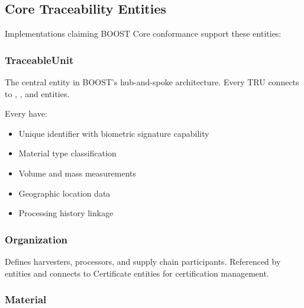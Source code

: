 
\subsection{Core Traceability Entities}
\label{sec:core-traceability-entities}

Implementations claiming BOOST Core conformance \MUST{} support these entities:

\subsubsection{TraceableUnit}
\label{sec:entity-traceable-unit}

The central entity in BOOST's hub-and-spoke architecture. Every TRU connects to , , and  entities.

\begin{normative}[title=TraceableUnit Requirements]
Every \TRU{} \MUST{} have:
\begin{itemize}
    \item Unique identifier with biometric signature capability
    \item Material type classification
    \item Volume and mass measurements
    \item Geographic location data
    \item Processing history linkage
\end{itemize}
\end{normative}



\subsubsection{Organization}
\label{sec:entity-organization}

Defines harvesters, processors, and supply chain participants. Referenced by \TRU{} entities and connects to Certificate entities for certification management.



\subsubsection{Material}
\label{sec:entity-material}

